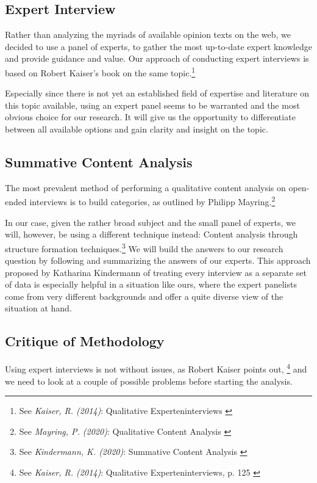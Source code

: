 \subsection{Expert Interview}

Rather than analyzing the myriads of available opinion texts on the web, we decided to use a panel of experts, to gather the most up-to-date expert knowledge and provide guidance and value. Our approach of conducting expert interviews is based on Robert Kaiser's book on the same topic.\footnote{See \textit{Kaiser, R. (2014)}: Qualitative Experteninterviews \cite{expertInterviews}}

Especially since there is not yet an established field of expertise and literature on this topic available, using an expert panel seems to be warranted and the most obvious choice for our research. It will give us the opportunity to differentiate between all available options and gain clarity and insight on the topic.

\subsection{Summative Content Analysis} 

The most prevalent method of performing a qualitative content analysis on open-ended interviews is to build categories, as outlined by Philipp Mayring.\footnote{See \textit{Mayring, P. (2020)}: Qualitative Content Analysis \cite{qualiContent}}

In our case, given the rather broad subject and the small panel of experts, we will, however, be using a different technique instead: Content analysis through structure formation techniques.\footnote{See \textit{Kindermann, K. (2020)}: Summative Content Analysis \cite{summaContent}} We will build the answers to our research question by following and summarizing the answers of our experts. This approach proposed by Katharina Kindermann of treating every interview as a separate set of data is especially helpful in a situation like ours, where the expert panelists come from very different backgrounds and offer a quite diverse view of the situation at hand.

\subsection{Critique of Methodology}

Using expert interviews is not without issues, as Robert Kaiser points out, \footnote{See \textit{Kaiser, R. (2014)}: Qualitative Experteninterviews, p. 125 \cite{expertInterviews}} and we need to look at a couple of possible problems before starting the analysis.

